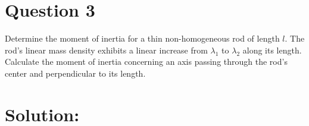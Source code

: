\section*{Question 3}
Determine the moment of inertia for a thin non-homogeneous rod of length $l$. The rod's linear mass density exhibits a linear increase from $\lambda_1$ to $\lambda_2$ along its length. Calculate the moment of inertia concerning an axis passing through the rod's center and perpendicular to its length.

\section*{Solution:}